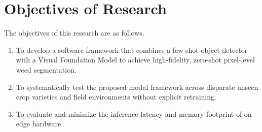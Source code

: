 \section{Objectives of Research}
The objectives of this research are as follows.

\begin{enumerate}[label=\arabic*.,leftmargin=2em,itemsep=2pt,topsep=0pt]

\item To develop a software framework that combines a few-shot object detector with a Visual Foundation Model to achieve high-fidelity, zero-shot pixel-level weed segmentation.

\item To systematically test the proposed modal framework across disparate unseen crop varieties and field environments without explicit retraining.

\item To evaluate and minimize the inference latency and memory footprint of on edge hardware.
\end{enumerate}
